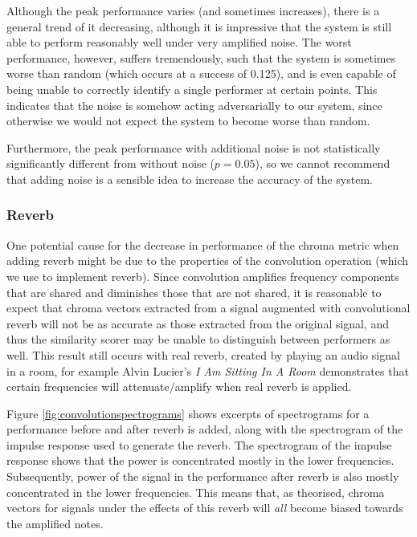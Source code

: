 \documentclass[oneside, class=book, 12pt, crop=false]{standalone}
\begin{document}
Although the peak performance varies (and sometimes increases), there is a general trend of it decreasing, although it is impressive that the system is still able to perform reasonably well under very amplified noise. The worst performance, however, suffers tremendously, such that the system is sometimes worse than random (which occurs at a success of 0.125), and is even capable of being unable to correctly identify a single performer at certain points. This indicates that the noise is somehow acting adversarially to our system, since otherwise we would not expect the system to become worse than random.

Furthermore, the peak performance with additional noise is not statistically significantly different from without noise ($p=0.05$), so we cannot recommend that adding noise is a sensible idea to increase the accuracy of the system.

\subsubsection{Reverb}\label{sec:reverb issues}

One potential cause for the decrease in performance of the chroma metric when adding reverb might be due to the properties of the convolution operation (which we use to implement reverb). Since convolution amplifies frequency components that are shared and diminishes those that are not shared, it is reasonable to expect that chroma vectors extracted from a signal augmented with convolutional reverb will not be as accurate as those extracted from the original signal, and thus the similarity scorer may be unable to distinguish between performers as well. This result still occurs with real reverb, created by playing an audio signal in a room, for example Alvin Lucier's \textit{I Am Sitting In A Room}\cite{alvinlucier}  demonstrates that certain frequencies will attenuate/amplify when real reverb is applied.

Figure \ref{fig:convolutionspectrograms} shows excerpts of spectrograms for a performance before and after reverb is added, along with the spectrogram of the impulse response used to generate the reverb. The spectrogram of the impulse response shows that the power is concentrated mostly in the lower frequencies. Subsequently, power of the signal in the performance after reverb is also mostly concentrated in the lower frequencies. This means that, as theorised, chroma vectors for signals under the effects of this reverb will \textit{all} become biased towards the amplified notes.
\end{document}
